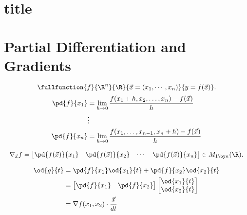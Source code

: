 \section{title}
	\section{Partial Differentiation and Gradients}
	\begin{tcolorbox}[colframe=defcolor,title={\color{white}\bf Partial Derivative}]
		\begin{definition}
			\[
			\fullfunction{f}{\R^n}{\R}{\vec{x}=(x_1,\cdots, x_n)}{y=f(\vec{x})}.
			\] \begin{align*}
			\pd{f}{x_1}&=\lim\limits_{h\to 0}\frac{f(x_1+h,x_2,\dots, x_n)-f(\vec{x})}{h}\\
			&\vdots\\
			\pd{f}{x_n}&=\lim\limits_{h\to 0}\frac{f(x_1,\dots,x_{n-1}, x_n+h)-f(\vec{x})}{h}\\
			\end{align*}
		\end{definition}
	\end{tcolorbox}
	\begin{remark}[Gradient]
		\[
		\nabla_{\vec{x}}f=\begin{bmatrix}
		\pd{f(\vec{x})}{x_1} & \pd{f(\vec{x})}{x_2} & \cdots & \pd{f(\vec{x})}{x_n}
		\end{bmatrix}\in M_{1\by n}(\R).
		\]
	\end{remark}
	
	\begin{example}

		\begin{align*}
		\od{g}{t}&=\pd{f}{x_1}\od{x_1}{t}+\pd{f}{x_2}\od{x_2}{t}\\
		&=\begin{bmatrix}
		\pd{f}{x_1} & \pd{f}{x_2}
		\end{bmatrix}\begin{bmatrix}
		\od{x_1}{t}\\ \od{x_2}{t}
		\end{bmatrix}\\
		&=\nabla f(x_1,x_2)\cdot\frac{\vec{x}}{dt}
		\end{align*}
		
		
		\begin{figure}[h!]\centering
		\end{figure}
	\end{example}
	
